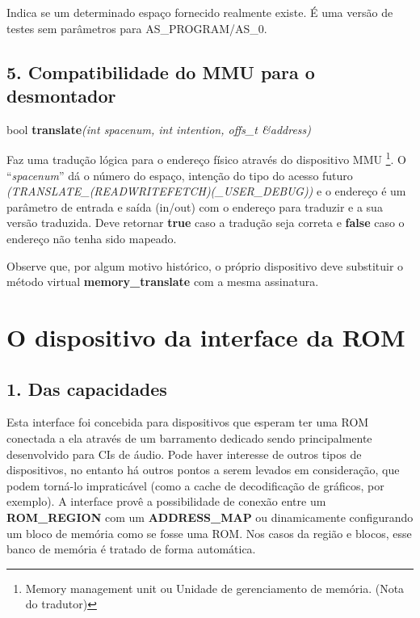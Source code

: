 \documentclass[letterpaper,10pt,brazil]{sphinxmanual}
\begin{document}
Indica se um determinado espaço fornecido realmente existe. É uma versão
de testes sem parâmetros para AS\_PROGRAM/AS\_0.


\subsection{5. Compatibilidade do MMU para o desmontador}
\label{techspecs/device_memory_interface:compatibilidade-do-mmu-para-o-desmontador}
\begin{DUlineblock}{0em}
\item[] bool \textbf{translate}\emph{(int spacenum, int intention, offs\_t \&address)}
\end{DUlineblock}

Faz uma tradução lógica para o endereço físico através do dispositivo
MMU \footnote[1]{\sphinxAtStartFootnote%
Memory management unit ou Unidade de gerenciamento de memória.
(Nota do tradutor)
}. O ``\emph{spacenum}'' dá o número do espaço, intenção do tipo do
acesso futuro \emph{(TRANSLATE\_(READ\textbar{}WRITE\textbar{}FETCH)(\textbar{}\_USER\textbar{}\_DEBUG))} e o
endereço é um parâmetro de entrada e saída (in/out) com o endereço para
traduzir e a sua versão traduzida. Deve retornar \textbf{true} caso a tradução
seja correta e \textbf{false} caso o endereço não tenha sido mapeado.

Observe que, por algum motivo histórico, o próprio dispositivo
deve substituir o método virtual \textbf{memory\_translate} com a
mesma assinatura.
\clearpage

\section{O dispositivo da interface da ROM}
\label{techspecs/device_rom_interface::doc}\label{techspecs/device_rom_interface:o-dispositivo-da-interface-da-rom}

\subsection{1. Das capacidades}
\label{techspecs/device_rom_interface:das-capacidades}
Esta interface foi concebida para dispositivos que esperam ter uma
ROM conectada a ela através de um barramento dedicado sendo
principalmente desenvolvido para CIs de áudio. Pode haver interesse de
outros tipos de dispositivos, no entanto há outros pontos a serem
levados em consideração, que podem torná-lo impraticável (como a cache
de decodificação de gráficos, por exemplo). A interface provê a
possibilidade de conexão entre um \textbf{ROM\_REGION} com um \textbf{ADDRESS\_MAP}
ou dinamicamente configurando um bloco de memória como se fosse uma ROM.
Nos casos da região e blocos, esse banco de memória é tratado de forma
automática.
\end{document}
